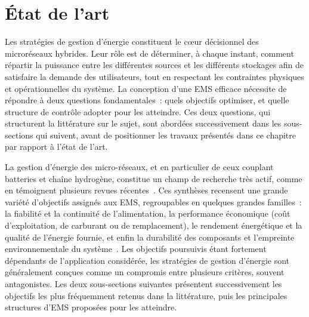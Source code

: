 
\section{État de l'art}
\label{sec:eda}

Les stratégies de gestion d'énergie constituent le c\oe{}ur décisionnel des microréseaux hybrides.
Leur rôle est de déterminer, à chaque instant, comment répartir la puissance entre les différentes sources et les différents stockages afin de satisfaire la demande des utilisateurs, tout en respectant les contraintes physiques et opérationnelles du système.
La conception d'une EMS efficace nécessite de répondre à deux questions fondamentales~: quels objectifs optimiser, et quelle structure de contrôle adopter pour les atteindre.
Ces deux questions, qui structurent la littérature sur le sujet, sont abordées successivement dans les sous-sections qui suivent, avant de positionner les travaux présentés dans ce chapitre par rapport à l'état de l'art.

La gestion d'énergie des micro-réseaux, et en particulier de ceux couplant batteries et chaîne hydrogène, constitue un champ de recherche très actif, comme en témoignent plusieurs revues récentes~\cite{zhu_comprehensive_2026}\cite{esparza_review_2025}\cite{chowdhury_optimization_2026}.
Ces synthèses recensent une grande variété d'objectifs assignés aux EMS, regroupables en quelques grandes familles~: la fiabilité et la continuité de l'alimentation, la performance économique (coût d'exploitation, de carburant ou de remplacement), le rendement énergétique et la qualité de l'énergie fournie, et enfin la durabilité des composants et l'empreinte environnementale du système~\cite{esparza_review_2025}\cite{chowdhury_optimization_2026}.
Les objectifs poursuivis étant fortement dépendants de l'application considérée, les stratégies de gestion d'énergie sont généralement conçues comme un compromis entre plusieurs critères, souvent antagonistes. Les deux sous-sections suivantes présentent successivement les objectifs les plus fréquemment retenus dans la littérature, puis les principales structures d'EMS proposées pour les atteindre.

